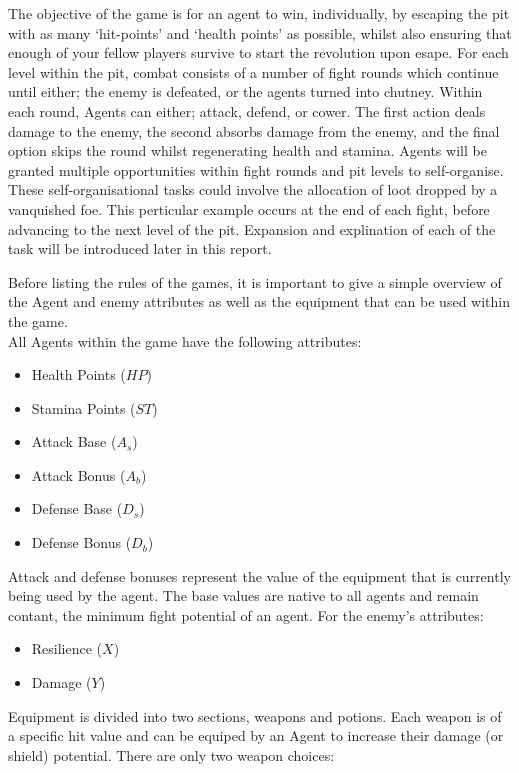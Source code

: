 The objective of the game is for an \Gls{agent} to win, individually, by escaping the pit with as many `hit-points' and `health points' as possible, whilst also ensuring that enough of your fellow players survive to start the revolution upon esape. 
For each level within the pit, combat consists of a number of fight rounds which continue until either; the enemy is defeated, or the agents turned into chutney. Within each round, Agents can either; attack, defend, or cower. The first action deals damage to the enemy, the second absorbs damage from the enemy, and the final option skips the round whilst regenerating health and stamina.
Agents will be granted multiple opportunities within fight rounds and pit levels to self-organise. These self-organisational tasks could involve the allocation of \gls{loot} dropped by a vanquished foe. This perticular example occurs at the end of each fight, before advancing to the next level of the pit. Expansion and explination of each of the task will be introduced later in this report. 

Before listing the rules of the games, it is important to give a simple overview of the Agent and enemy attributes as well as the equipment that can be used within the game.  \\

All Agents within the game have the following attributes:

\begin{itemize} 
    \item Health Points ($HP$)
    \item Stamina Points ($ST$)
    \item Attack Base ($A_s$)
    \item Attack Bonus ($A_b$)
    \item Defense Base ($D_s$)
    \item Defense Bonus ($D_b$)
\end{itemize}

Attack and defense bonuses represent the value of the equipment that is currently being used by the agent. The base values are native to all agents and remain contant, the minimum fight potential of an agent. For the enemy's attributes:

\begin{itemize}
    \item Resilience ($X$)
    \item Damage ($Y$)
\end{itemize}

Equipment is divided into two sections, weapons and potions. Each weapon is of a specific hit value and can be equiped by an Agent to increase their damage (or shield) potential. There are only two weapon choices:

